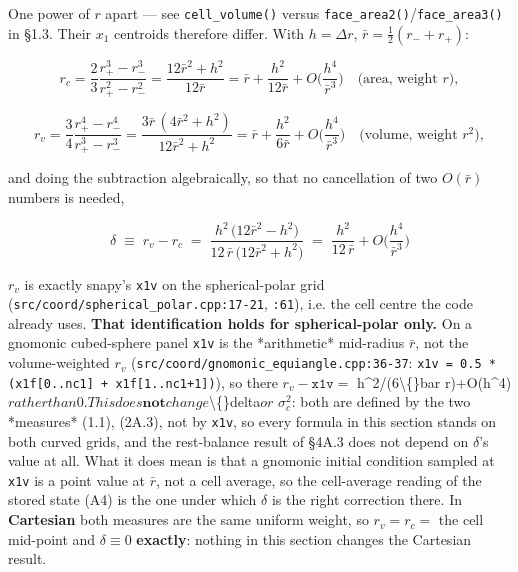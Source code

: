 \documentclass[11pt,a4paper]{article}
\begin{document}
One power of $r$ apart — see \texttt{cell\_volume()} versus \texttt{face\_area2()}/\texttt{face\_area3()}
in §1.3. Their $x_1$ centroids therefore differ. With $h=\Delta r$,
$\bar r=\tfrac12(r_-+r_+)$:

\begin{equation*}
r_c = \frac{2}{3}\frac{r_+^3-r_-^3}{r_+^2-r_-^2} = \frac{12\bar r^2+h^2}{12\bar r}
    = \bar r + \frac{h^2}{12\bar r}+O\!\Big(\frac{h^4}{\bar r^3}\Big)
\quad\text{(area, weight } r),
\tag{2A.1}
\end{equation*}

\begin{equation*}
r_v = \frac{3}{4}\frac{r_+^4-r_-^4}{r_+^3-r_-^3}
    = \frac{3\bar r\,(4\bar r^2+h^2)}{12\bar r^2+h^2}
    = \bar r + \frac{h^2}{6\bar r}+O\!\Big(\frac{h^4}{\bar r^3}\Big)
\quad\text{(volume, weight } r^2),
\tag{2A.2}
\end{equation*}

and doing the subtraction algebraically, so that no cancellation of two
$O(\bar r)$ numbers is needed,

\begin{equation*}
\boxed{\;
\delta \;\equiv\; r_v - r_c
\;=\; \frac{h^2\,\big(12\bar r^2 - h^2\big)}{12\,\bar r\,\big(12\bar r^2+h^2\big)}
\;=\; \frac{h^2}{12\,\bar r} + O\!\Big(\frac{h^4}{\bar r^3}\Big)
\;}
\tag{2A.3}
\end{equation*}

$r_v$ is exactly snapy's \texttt{x1v} on the spherical-polar grid
(\texttt{src/coord/spherical\_polar.cpp:17-21}, \texttt{:61}), i.e. the cell centre the code
already uses. \textbf{That identification holds for spherical-polar only.} On a
gnomonic cubed-sphere panel \texttt{x1v} is the *arithmetic* mid-radius $\bar r$, not
the volume-weighted $r_v$ (\texttt{src/coord/gnomonic\_equiangle.cpp:36-37}:
\texttt{x1v = 0.5 * (x1f[0..nc1] + x1f[1..nc1+1])}), so there $r_v - \texttt{x1v} =$
h\textasciicircum{}2/(6\textbackslash\{\}bar r)+O(h\textasciicircum{}4)$ rather than $0$. This does \textbf{not} change $\textbackslash\{\}delta$ or$
$\sigma_c^2$: both are defined by the two *measures* (1.1), (2A.3), not by
\texttt{x1v}, so every formula in this section stands on both curved grids, and the
rest-balance result of §4A.3 does not depend on $\delta$'s value at all. What it
does mean is that a gnomonic initial condition sampled at \texttt{x1v} is a point value
at $\bar r$, not a cell average, so the cell-average reading of the stored state
(A4) is the one under which $\delta$ is the right correction there. In
\textbf{Cartesian} both measures are the same uniform weight, so
$r_v = r_c = $ the cell mid-point and $\delta \equiv 0$ \textbf{exactly}: nothing in
this section changes the Cartesian result.
\end{document}
